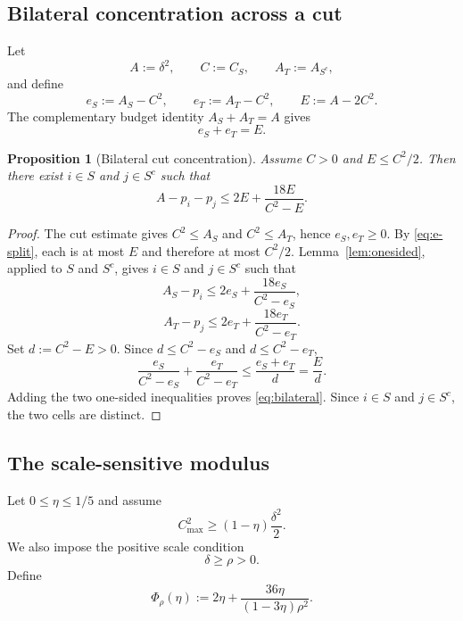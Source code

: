\documentclass[11pt]{article}
\newtheorem{proposition}[theorem]{Proposition}
\newcommand{\cmax}{C_{\max}}
\newcommand{\dd}{\delta}
\newcommand{\etaq}{\eta}
\newcommand{\PhiRho}{\Phi_{\rho}}
\begin{document}
\subsection{Bilateral concentration across a cut}

Let
\[
  A:=\dd^2,\qquad C:=C_S,\qquad
  A_T:=A_{S^c},
\]
and define
\[
  e_S:=A_S-C^2,\qquad
  e_T:=A_T-C^2,\qquad
  E:=A-2C^2.
\]
The complementary budget identity $A_S+A_T=A$ gives
\begin{equation}\label{eq:e-split}
  e_S+e_T=E.
\end{equation}

\begin{proposition}[Bilateral cut concentration]\label{prop:bilateral}
Assume $C>0$ and $E\le C^2/2$.  Then there exist
$i\in S$ and $j\in S^c$ such that
\begin{equation}\label{eq:bilateral}
  A-p_i-p_j
  \le
  2E+\frac{18E}{C^2-E}.
\end{equation}
\end{proposition}

\begin{proof}
The cut estimate gives $C^2\le A_S$ and $C^2\le A_T$, hence
$e_S,e_T\ge0$.  By \eqref{eq:e-split}, each is at most $E$ and therefore at
most $C^2/2$.  Lemma~\ref{lem:onesided}, applied to $S$ and $S^c$, gives
$i\in S$ and $j\in S^c$ such that
\[
  A_S-p_i
  \le
  2e_S+\frac{18e_S}{C^2-e_S},
\]
\[
  A_T-p_j
  \le
  2e_T+\frac{18e_T}{C^2-e_T}.
\]
Set $d:=C^2-E>0$.  Since
$d\le C^2-e_S$ and $d\le C^2-e_T$,
\[
  \frac{e_S}{C^2-e_S}
  +
  \frac{e_T}{C^2-e_T}
  \le
  \frac{e_S+e_T}{d}
  =
  \frac Ed.
\]
Adding the two one-sided inequalities proves
\eqref{eq:bilateral}.  Since $i\in S$ and $j\in S^c$, the two cells are
distinct.
\end{proof}

\subsection{The scale-sensitive modulus}

Let $0\le\etaq\le1/5$ and assume
\begin{equation}\label{eq:near}
  \cmax^2
  \ge
  (1-\etaq)\frac{\dd^2}{2}.
\end{equation}
We also impose the positive scale condition
\begin{equation}\label{eq:scale}
  \dd\ge\rho>0.
\end{equation}
Define
\begin{equation}\label{eq:modulus}
  \PhiRho(\etaq):=
  2\etaq+
  \frac{36\etaq}{(1-3\etaq)\rho^2}.
\end{equation}
\end{document}
